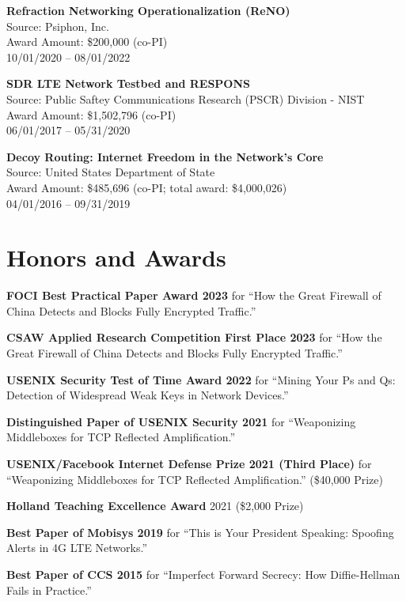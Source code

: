 \documentclass[margin,11pt]{res} %
\begin{document}
\textbf{Refraction Networking Operationalization (ReNO)} \\
Source: Psiphon, Inc. \\
Award Amount: \$200,000 (co-PI) \\
10/01/2020 -- 08/01/2022

\textbf{SDR LTE Network Testbed and RESPONS} \\
Source: Public Saftey Communications Research (PSCR) Division - NIST \\
Award Amount: \$1,502,796 (co-PI) \\
06/01/2017 -- 05/31/2020

\textbf{Decoy Routing: Internet Freedom in the Network's Core} \\
Source: United States Department of State \\
Award Amount: \$485,696 (co-PI; total award: \$4,000,026) \\
04/01/2016 -- 09/31/2019



\vspace{6pt}
\section{\large Honors and Awards}

    \textbf{FOCI Best Practical Paper Award 2023}
    for ``How the Great Firewall of China Detects and Blocks Fully Encrypted Traffic.''

    \textbf{CSAW Applied Research Competition First Place 2023}
    for ``How the Great Firewall of China Detects and Blocks Fully Encrypted Traffic.''

    \textbf{USENIX Security Test of Time Award 2022}
     for ``Mining Your Ps and Qs: Detection of Widespread Weak Keys in Network Devices.''

    \textbf{Distinguished Paper of USENIX Security 2021}
    for ``Weaponizing Middleboxes for TCP Reflected Amplification.''

    \textbf{USENIX/Facebook Internet Defense Prize 2021 (Third Place)}
    for ``Weaponizing Middleboxes for TCP Reflected Amplification.'' (\$40,000 Prize)

    \textbf{Holland Teaching Excellence Award} 2021 (\$2,000 Prize)

    \textbf{Best Paper of Mobisys 2019}
    for ``This is Your President Speaking: Spoofing Alerts in 4G LTE Networks.''

    \textbf{Best Paper of CCS 2015}
    for ``Imperfect Forward Secrecy: How Diffie-Hellman Fails in Practice.''
\end{document}
